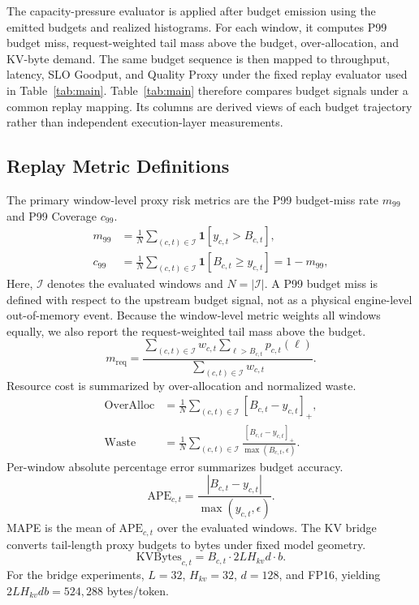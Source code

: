 \documentclass[sigplan,10pt, anonymous]{acmart}
\begin{document}
The capacity-pressure evaluator is applied after budget emission using the emitted budgets and realized histograms. For each window, it computes P99 budget miss, request-weighted tail mass above the budget, over-allocation, and KV-byte demand. The same budget sequence is then mapped to throughput, latency, SLO Goodput, and Quality Proxy under the fixed replay evaluator used in Table~\ref{tab:main}. Table~\ref{tab:main} therefore compares budget signals under a common replay mapping. Its columns are derived views of each budget trajectory rather than independent execution-layer measurements.

\subsection{Replay Metric Definitions}
\label{app:metrics}
The primary window-level proxy risk metrics are the P99 budget-miss rate $m_{99}$ and P99 Coverage $c_{99}$.
\begin{equation}
\label{eq:eval_miss_cov_app}
\begin{aligned}
m_{99}
&= \frac{1}{N}\sum_{(c,t)\in\mathcal{I}}
 \mathbf{1}[y_{c,t}>B_{c,t}], \\
c_{99}
&= \frac{1}{N}\sum_{(c,t)\in\mathcal{I}}
 \mathbf{1}[B_{c,t}\ge y_{c,t}]
 = 1-m_{99},
\end{aligned}
\end{equation}
\pagebreak[4]
Here, $\mathcal{I}$ denotes the evaluated windows and $N=|\mathcal{I}|$. A P99 budget miss is defined with respect to the upstream budget signal, not as a physical engine-level out-of-memory event. Because the window-level metric weights all windows equally, we also report the request-weighted tail mass above the budget.
\begin{equation}
\label{eq:req_miss_mass_app}
m_{\mathrm{req}}
=
\frac{\sum_{(c,t)\in\mathcal{I}} w_{c,t}
 \sum_{\ell>B_{c,t}}p_{c,t}(\ell)}
 {\sum_{(c,t)\in\mathcal{I}}w_{c,t}} .
\end{equation}
Resource cost is summarized by over-allocation and normalized waste.
\begin{equation}
\label{eq:eval_waste_app}
\begin{aligned}
\mathrm{OverAlloc}
&= \frac{1}{N}\sum_{(c,t)\in\mathcal{I}}
 [B_{c,t}-y_{c,t}]_+, \\
\mathrm{Waste}
&= \frac{1}{N}\sum_{(c,t)\in\mathcal{I}}
 \frac{[B_{c,t}-y_{c,t}]_+}{\max(B_{c,t},\epsilon)} .
\end{aligned}
\end{equation}
Per-window absolute percentage error summarizes budget accuracy.
\begin{equation}
\label{eq:eval_ape_app}
\mathrm{APE}_{c,t}
=
\frac{|B_{c,t}-y_{c,t}|}{\max(y_{c,t},\epsilon)} .
\end{equation}
MAPE is the mean of $\mathrm{APE}_{c,t}$ over the evaluated windows. The KV bridge converts tail-length proxy budgets to bytes under fixed model geometry.
\begin{equation}
\label{eq:kv_bytes_app}
\mathrm{KVBytes}_{c,t}
= B_{c,t}\cdot 2LH_{kv}d\cdot b .
\end{equation}
For the bridge experiments, $L=32$, $H_{kv}=32$, $d=128$, and FP16, yielding $2LH_{kv}d b=524{,}288$ bytes/token.
\end{document}
